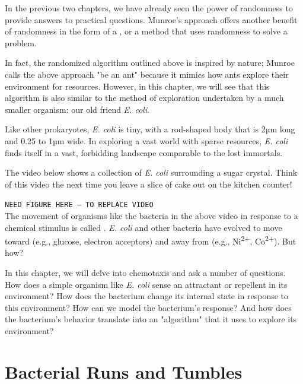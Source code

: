 In the previous two chapters, we have already seen the power of randomness to provide answers to practical questions. Munroe's approach offers another benefit of randomness in the form of a , or a method that uses randomness to solve a problem.

In fact, the randomized algorithm outlined above is inspired by nature; Munroe calls the above approach "be an ant" because it mimics how ants explore their environment for resources. However, in this chapter, we will see that this algorithm is also similar to the method of exploration undertaken by a much smaller organism: our old friend \textit{E. coli}.

Like other prokaryotes, \textit{E. coli} is tiny, with a rod-shaped body that is 2µm long and 0.25 to 1µm wide.\citep{Pierucci_1978} In exploring a vast world with sparse resources, \textit{E. coli} finds itself in a vast, forbidding landscape comparable to the lost immortals.

The video below shows a collection of \textit{E. coli} surrounding a sugar crystal. Think of this video the next time you leave a slice of cake out on the kitchen counter!

\texttt{NEED FIGURE HERE -- TO REPLACE VIDEO}\\

The movement of organisms like the bacteria in the above video in response to a chemical stimulus is called . \textit{E. coli} and other bacteria have evolved to move toward  (e.g., glucose, electron acceptors) and away from  (e.g., Ni\textsuperscript{2+}, Co\textsuperscript{2+}). But how?

In this chapter, we will delve into chemotaxis and ask a number of questions. How does a simple organism like \textit{E. coli} sense an attractant or repellent in its environment? How does the bacterium change its internal state in response to this environment? How can we model the bacterium's response? And how does the bacterium's behavior translate into an "algorithm" that it uses to explore its environment?

\FloatBarrier
{}
\section{Bacterial Runs and Tumbles}
\label{sec:bacterial_runs_and_tumbles}

